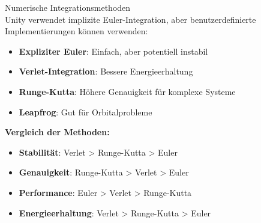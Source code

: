 \begin{concept}{Numerische Integrationsmethoden}\\
    Unity verwendet implizite Euler-Integration, aber benutzerdefinierte Implementierungen können verwenden:
    \begin{itemize}
        \item \textbf{Expliziter Euler}: Einfach, aber potentiell instabil
        \item \textbf{Verlet-Integration}: Bessere Energieerhaltung
        \item \textbf{Runge-Kutta}: Höhere Genauigkeit für komplexe Systeme
        \item \textbf{Leapfrog}: Gut für Orbitalprobleme
    \end{itemize}
    
    \textbf{Vergleich der Methoden:}
    \begin{itemize}
        \item \textbf{Stabilität}: Verlet > Runge-Kutta > Euler
        \item \textbf{Genauigkeit}: Runge-Kutta > Verlet > Euler
        \item \textbf{Performance}: Euler > Verlet > Runge-Kutta
        \item \textbf{Energieerhaltung}: Verlet > Runge-Kutta > Euler
    \end{itemize}
\end{concept}

